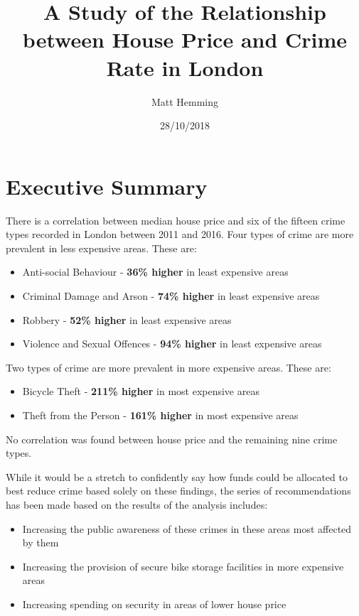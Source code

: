 \documentclass{article}
\title{A Study of the Relationship between House Price and Crime Rate in London}
\date{28/10/2018}
\author{Matt Hemming}
\begin{document}

\maketitle %
\newpage %

\tableofcontents
\newpage

\section{Executive Summary} \label{Executive Summary}

There is a correlation between median house price and six of the fifteen crime types recorded in London between 2011 and 2016. Four types of crime are more prevalent in less expensive areas. These are:
\begin{itemize}
\item Anti-social Behaviour - \textbf{36\% higher} in least expensive areas
\item Criminal Damage and Arson	    - \textbf{74\% higher} in least expensive areas
\item Robbery			    - \textbf{52\% higher} in least expensive areas
\item Violence and Sexual Offences - \textbf{94\% higher} in least expensive areas
\end{itemize}
Two types of crime are more prevalent in more expensive areas. These are:
\begin{itemize}
\item Bicycle Theft 			   - \textbf{211\% higher} in most expensive areas
\item Theft from the Person 	   - \textbf{161\% higher} in most expensive areas
\end{itemize}

No correlation was found between house price and the remaining nine crime types.
\newline 

While it would be a stretch to confidently say how funds could be allocated to best reduce crime based solely on these findings, the series of recommendations has been made based on the results of the analysis includes:

\begin{itemize}
\item Increasing the public awareness of these crimes in these areas most affected by them
\item Increasing the provision of secure bike storage facilities in more expensive areas
\item Increasing spending on security in areas of lower house price
\end{itemize}
\end{document}
